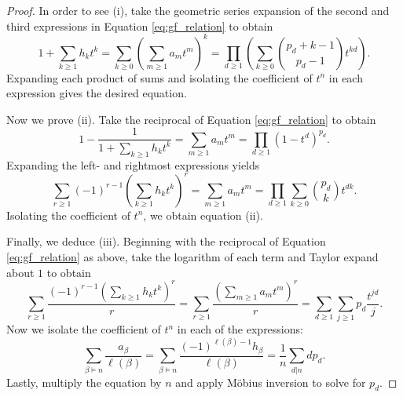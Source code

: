 \documentclass[11pt]{amsart}
\theoremstyle{definition}
\numberwithin{equation}{section}
\begin{document}
\begin{proof}

In order to see (i), take the geometric series expansion of the second and third expressions in Equation \eqref{eq:gf_relation} to obtain
\begin{equation}\label{eq:gf_relation}
1 + \sum_{k \geq 1} h_k t^k = \sum_{k \geq 0} \left(\sum_{m \geq 1} a_m t^m\right)^k = \prod_{d \geq 1}
\left(\sum_{k \geq 0} \binom{p_d+k-1}{p_d-1} t^{kd}\right).
\end{equation}
Expanding each product of sums and isolating the coefficient of $t^{n}$ in each expression gives the desired equation.

Now we prove (ii).  Take the reciprocal of Equation \eqref{eq:gf_relation} to obtain
\[
1 - \frac{1}{1 + \sum_{k \geq 1} h_k t^k} 
= \sum_{m \geq 1} a_m t^m 
= \prod_{d \geq 1} (1-t^d)^{p_d}.
\]
Expanding the left- and rightmost expressions yields
\[
\sum_{r \geq 1} (-1)^{r-1} \left(\sum_{k \geq 1} h_k t^k\right)^r
= \sum_{m \geq 1} a_m t^m
= \prod_{d \geq 1} \sum_{k \geq 0} \binom{p_d}{k} t^{dk}.
\]
Isolating the coefficient of $t^{n}$, we obtain equation (ii).

Finally, we deduce (iii).  Beginning with the reciprocal of Equation \eqref{eq:gf_relation} as above, take the logarithm of each term and Taylor expand about $1$ to obtain
%
\[
 \sum_{r \geq 1} \frac{(-1)^{r-1}(\sum_{k \geq 1} h_k t^k )^r}{r}
= \sum_{r \geq 1} \frac{(\sum_{m \geq 1} a_m t^m )^r}{r}
= \sum_{d \geq 1} \sum_{j \geq 1} p_d \frac{t^{jd}}{j}.
\]
Now we isolate the coefficient of $t^{n}$ in each of the expressions: 
\[
\sum_{\beta \vDash n} \frac{a_\beta}{\ell(\beta)}
= \sum_{\beta \vDash n} \frac{(-1)^{\ell(\beta)-1} h_\beta}{\ell(\beta)}
= \frac{1}{n} \sum_{d | n} d p_{d} .
\]
Lastly, multiply the equation by $n$ and apply M\"{o}bius inversion to solve for $p_{d}$.
\end{proof}
\end{document}
